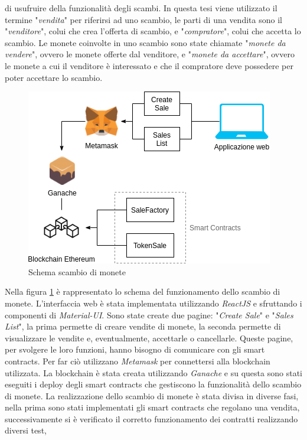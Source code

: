 \documentclass[a4paper]{article}
\begin{document}
        di usufruire della funzionalità degli scambi.
        \newline
        In questa tesi viene utilizzato il termine "\emph{vendita}" per riferirsi ad uno scambio, le parti di una vendita sono il "\emph{venditore}", colui che crea l'offerta di scambio, e "\emph{compratore}", colui che accetta lo scambio.
        Le monete coinvolte in uno scambio sono state chiamate "\emph{monete da vendere}", ovvero le monete offerte dal venditore, e "\emph{monete da accettare}", ovvero le monete a cui il venditore è interessato e che il compratore deve possedere per poter
        accettare lo scambio.
        \begin{figure}[H]
          \includegraphics[scale=0.9, fbox]{structure.png}
          \centering
          \caption{Schema scambio di monete}
          \centering
          \label{fig:structure}
        \end{figure}
        Nella figura \ref{fig:structure} è rappresentato lo schema del funzionamento dello scambio di monete. L'interfaccia web è stata implementata utilizzando \emph{ReactJS} e sfruttando i componenti di \emph{Material-UI}.
        Sono state create due pagine: "\emph{Create Sale}" e "\emph{Sales List}", la prima permette di creare vendite di monete, la seconda permette di visualizzare le vendite e, eventualmente, accettarle o cancellarle.
        Queste pagine, per svolgere le loro funzioni, hanno bisogno di comunicare con gli smart contracts. Per far ciò utilizzano \emph{Metamask} per connettersi alla blockchain utilizzata. La blockchain è stata creata utilizzando \emph{Ganache} e
        su questa sono stati eseguiti i deploy degli smart contracts che gestiscono la funzionalità dello scambio di monete.
        \newline
        La realizzazione dello scambio di monete è stata divisa in diverse fasi, nella prima sono stati implementati gli smart contracts che regolano una vendita, successivamente si è verificato il corretto funzionamento dei contratti realizzando diversi test,
\end{document}
